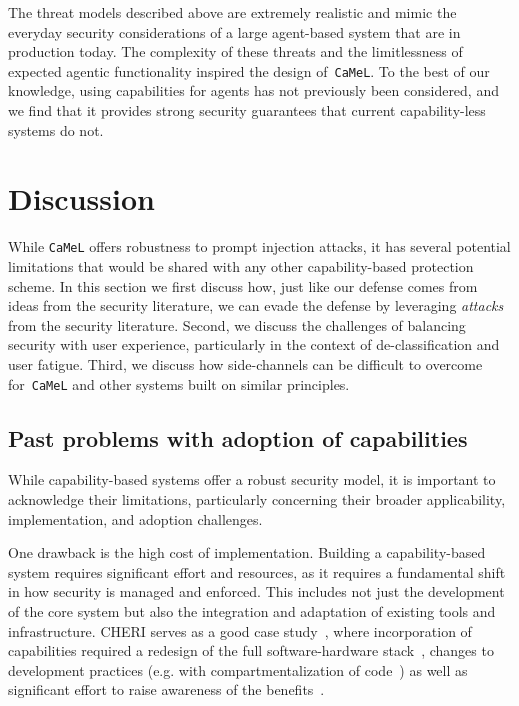 \documentclass[11pt, a4paper, logo, copyright]{googledeepmind}
\newcommand{\sysname}{\texttt{CaMeL}\xspace}
\begin{document}
The threat models described above are extremely realistic and mimic the everyday security considerations of a large agent-based system that are in production today. The complexity of these threats and the limitlessness of expected agentic functionality inspired the design of~\sysname{}. To the best of our knowledge, using capabilities for agents has not previously been considered, and we find that it provides strong security guarantees that current capability-less systems do not.

\section{Discussion}
\label{sec:discussion}

While \sysname{} offers robustness to prompt injection attacks, it has several potential limitations that would be shared with any other capability-based protection scheme.
In this section we first discuss how, just like our defense comes from ideas from the security literature, we can evade the defense by leveraging \emph{attacks} from the security literature. Second, we discuss the challenges of balancing security with user experience, particularly in the context of de-classification and user fatigue. Third, we discuss how side-channels can be difficult to overcome for~\sysname{} and other systems built on similar principles.

\subsection{Past problems with adoption of capabilities}

While capability-based systems offer a robust security model, it is important to acknowledge their limitations, particularly concerning their broader applicability, implementation, and adoption challenges.

One drawback is the high cost of implementation. Building a capability-based system requires significant effort and resources, as it requires a fundamental shift in how security is managed and enforced. This includes not just the development of the core system but also the integration and adaptation of existing tools and infrastructure. CHERI serves as a good case study~\citep{watson2015cheri}, where incorporation of capabilities required a redesign of the full software-hardware stack~\citep{zaliva2024formalsemantics}, changes to development practices (e.g. with compartmentalization of code~\citep{gudka2015compartments}) as well as significant effort to raise awareness of the benefits~\citep{adoption}.
\end{document}
